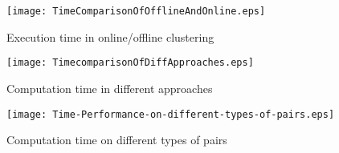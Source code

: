 \begin{figure}[th]
 \centerline{
 \texttt{[image: TimeComparisonOfOfflineAndOnline.eps]}}
 \caption{Execution time in online/offline clustering}
 \label{fig:TimeComparisonOfOfflineAndOnline}
\end{figure}

\begin{figure}[th]
 \centerline{
 \texttt{[image: TimecomparisonOfDiffApproaches.eps]}}
 \caption{Computation time in different approaches}
 \label{fig:TimecomparisonOfDiffApproaches}
\end{figure}

\begin{figure}[th]
 \centerline{
 \texttt{[image: Time-Performance-on-different-types-of-pairs.eps]}}
 \caption{Computation time on different types of pairs}
 \label{fig:Time-Performance-on-different-types-of-pairs}
\end{figure}


%

